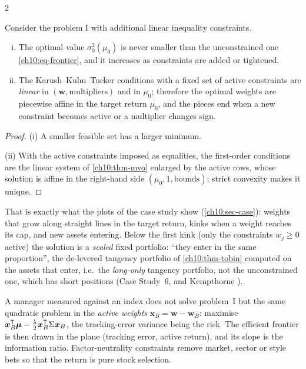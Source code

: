 \begin{paracol}{2}
\begin{proposition}\label{ch10:prop-constr}
Consider the problem I with additional linear inequality constraints.
\begin{enumerate}[(i)]
  \item The optimal value $\sigma_0^2(\mu_0)$ is
      never smaller than the unconstrained one \eqref{ch10:eq-frontier}, and it increases as constraints are added or tightened.
  \item The Karush--Kuhn--Tucker conditions with a fixed set of active constraints are \emph{linear} in
      $(\bm w,\text{multipliers})$ and in $\mu_0$; therefore the optimal weights are piecewise affine in the target return
      $\mu_0$, and the pieces end when a new constraint becomes active or a multiplier changes sign.
\end{enumerate}
\end{proposition}
\begin{proof}
(i) A smaller feasible set has a larger minimum.

(ii) With the active constraints imposed as equalities,
the first-order conditions are the linear system of \cref{ch10:thm-mvo} enlarged by the active rows, whose
solution is affine in the right-hand side $(\mu_0,1,\text{bounds})$; strict convexity makes it unique.
\end{proof}
That is exactly what the plots of the case study show (\cref{ch10:sec-case}): weights that grow along straight
lines in the target return, kinks when a weight reaches its cap, and new assets entering. Below the first
kink (only the constraints $w_j\ge0$ active) the solution is a \emph{scaled} fixed portfolio: ``they enter in the same
proportion'', the de-levered tangency portfolio of \cref{ch10:thm-tobin} computed on the assets that enter, i.e.\ the
\emph{long-only} tangency portfolio, not the unconstrained one, which has short positions (Case Study~6, and Kempthorne
).

\begin{finance}
A manager measured against an index does not solve problem~I but the same quadratic problem in the \emph{active
weights} $\bm x_B=\bm w-\bm w_B$: maximise $\bm x_B^{\mathsf T}\bm\mu-\frac\lambda2\bm x_B^{\mathsf T}\Sigma\bm x_B$, the tracking-error
variance being the risk. The efficient frontier is then drawn in the plane (tracking error, active return), and its
slope is the information ratio. Factor-neutrality constraints remove market, sector or style bets so that the
return is pure stock selection.
\end{finance}


\end{paracol}

